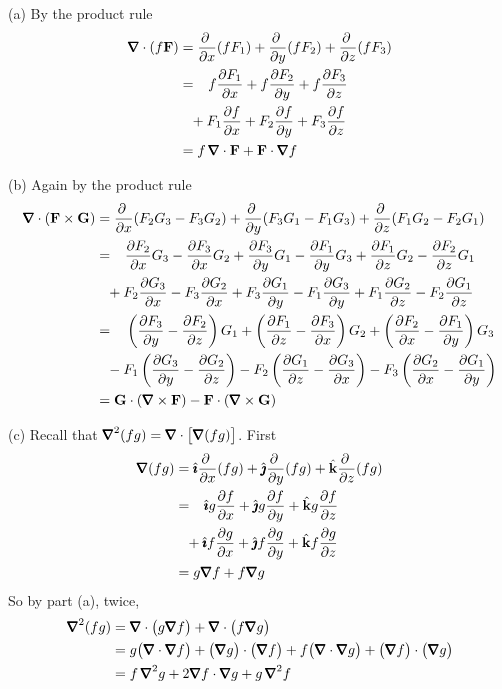 \begin{solution} 
(a) By the product rule
\begin{align*}
\vnabla\cdot(f\vF)
&=\pdiff{}{x}(fF_1)
 +\pdiff{}{y}(fF_2)
 +\pdiff{}{z}(fF_3) \\
&=\phantom{+}f\pdiff{F_1}{x}
 +f\pdiff{F_2}{y}
 +f\pdiff{F_3}{z} \\
&\phantom{=}+F_1\pdiff{f}{x}
 +F_2\pdiff{f}{y}
 +F_3\pdiff{f}{z} \\
&=f\,\vnabla\cdot\vF+\vF\cdot\vnabla f
\end{align*}

(b) Again by the product rule
\begin{align*}
\vnabla\cdot(\vF\times\vG)
&=\pdiff{}{x}(F_2G_3-F_3G_2)
 +\pdiff{}{y}(F_3G_1-F_1G_3)
 +\pdiff{}{z}(F_1G_2-F_2G_1) \\
&=\phantom{+}\pdiff{F_2}{x}G_3
        -\pdiff{F_3}{x}G_2
 +\pdiff{F_3}{y}G_1
        - \pdiff{F_1}{y}G_3
 +\pdiff{F_1}{z}G_2
       - \pdiff{F_2}{z}G_1 \\
&\phantom{=}+F_2\pdiff{G_3}{x}
       -F_3\pdiff{G_2}{x}
 +F_3\pdiff{G_1}{y}
       -F_1\pdiff{G_3}{y}
 +F_1\pdiff{G_2}{z} 
      - F_2\pdiff{G_1}{z} \\
&=\phantom{+}
  \left(\pdiff{F_3}{y}-\pdiff{F_2}{z}\right)G_1
  +\left(\pdiff{F_1}{z}-\pdiff{F_3}{x}\right)G_2
  +\left(\pdiff{F_2}{x}-\pdiff{F_1}{y}\right)G_3 \\
&\phantom{=}
  -F_1\left(\pdiff{G_3}{y}-\pdiff{G_2}{z}\right)
  -F_2\left(\pdiff{G_1}{z}-\pdiff{G_3}{x}\right)
  -F_3\left(\pdiff{G_2}{x}-\pdiff{G_1}{y}\right)
\\
&=\vG\cdot(\vnabla\times\vF)-
                       \vF\cdot(\vnabla\times\vG)
\end{align*}

(c) Recall that $\vnabla^2(fg) = \vnabla\cdot\big[\vnabla(fg)\big]$.
First
\begin{align*}
\vnabla(fg)
&=\hi\pdiff{}{x}(fg)
 +\hj\pdiff{}{y}(fg)
 +\hk\pdiff{}{z}(fg) \\
&=\phantom{+}\hi g\pdiff{f}{x}
 +\hj g\pdiff{f}{y}
 +\hk g\pdiff{f}{z} \\
&\phantom{=}+\hi f\frac{\partial g}{\partial x}
 +\hj f\frac{\partial g}{\partial y}
 +\hk f\frac{\partial g}{\partial z} \\
&=g\vnabla f+f\vnabla g
\end{align*}
So by part (a), twice,
\begin{align*}
\vnabla^2(fg)
& = \vnabla\cdot\big(g\vnabla f\big)
   +\vnabla\cdot\big(f\vnabla g\big) \\
&= g\big(\vnabla\cdot \vnabla f\big) 
          + \big(\vnabla g\big)\cdot\big(\vnabla f\big)
   +f\big(\vnabla\cdot\vnabla g\big)
       + \big(\vnabla f\big)\cdot\big(\vnabla g\big) \\
&=f\,\vnabla^2 g+2\vnabla f\cdot\vnabla g+g\,\vnabla^2 f
\end{align*}
\end{solution}


